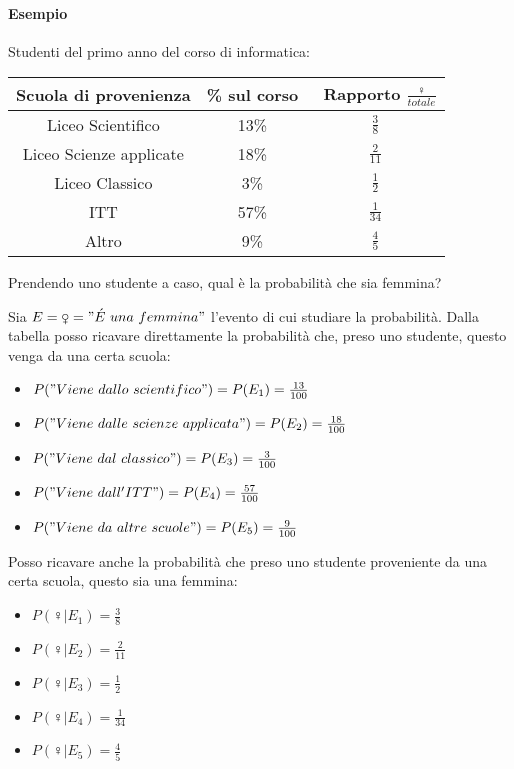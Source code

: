 \documentclass[12pt, a4paper]{report}
\theoremstyle{definition}
\begin{document}
\paragraph*{Esempio}
Studenti del primo anno del corso di informatica:
\begin{center}
	\renewcommand{\arraystretch}{1.5}
	\begin{tabular}{ |c|c|c| } 
		\hline
	 	Scuola di provenienza & \% sul corso & \ Rapporto $\frac{\female}{totale}$\\
	 	\hline
	 	Liceo Scientifico & 13\% & $\frac{3}{8}$ \\
	 	Liceo Scienze applicate & 18\% & $\frac{2}{11}$ \\ 
	 	Liceo Classico & 3\% & $\frac{1}{2}$ \\
		ITT & 57\% & $\frac{1}{34}$ \\
		Altro & 9\% & $\frac{4}{5}$ \\
	 	\hline
	\end{tabular}
\end{center}
Prendendo uno studente a caso, qual è la probabilità che sia femmina?

Sia \(E=\female ="\acute{E}\ una\ femmina"\) l'evento di cui studiare la
probabilità.
Dalla tabella posso ricavare direttamente la probabilità che, preso uno studente,
questo venga da una certa scuola:
\begin{itemize}
	\item \(P("Viene\ dallo\ scientifico") = P(E_1) = \frac{13}{100}\)
	\item \(P("Viene\ dalle\ scienze\ applicata") = P(E_2) = \frac{18}{100}\)
	\item \(P("Viene\ dal\ classico") = P(E_3) = \frac{3}{100}\)
	\item \(P("Viene\ dall'ITT") = P(E_4) = \frac{57}{100}\)
	\item \(P("Viene\ da\ altre\ scuole") = P(E_5) = \frac{9}{100}\)
\end{itemize}
\newpage
Posso ricavare anche la probabilità che preso uno studente proveniente da una 
certa scuola, questo sia una femmina:
\begin{itemize}
	\item \(P(\female|E_1)=\frac{3}{8}\)
	\item \(P(\female|E_2)=\frac{2}{11}\)
	\item \(P(\female|E_3)=\frac{1}{2}\)
	\item \(P(\female|E_4)=\frac{1}{34}\)
	\item \(P(\female|E_5)=\frac{4}{5}\)
\end{itemize}
\end{document}
